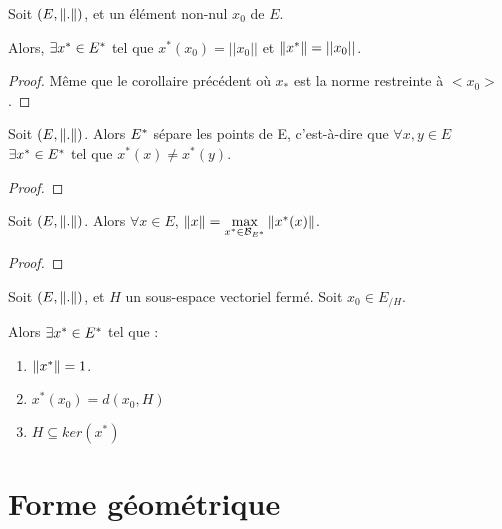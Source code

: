 \begin{corollary}
	Soit $(E, \norm{.})$, et un élément non-nul $x_{0}$ de $E$.

	Alors, $\exists x^{*} \in E^{*}$ tel que $x^{*}(x_{0}) = ||x_{0}||$ et
	$\norm{x^{*}} = ||x_{0}||$.
\end{corollary}

\ifdefined\outputproof
\begin{proof}
	Même que le corollaire précédent où $x_{*}$ est la norme restreinte à
	$<x_{0}>$.
\end{proof}
\fi

\begin{corollary}
	Soit $(E, \norm{.})$. Alors $E^{*}$ sépare les points de
	E, c'est-à-dire que $\forall x, y \in E$ $\exists x^{*} \in E^{*}$ tel
	que $x^{*}(x) \neq x^{*}(y)$.
\end{corollary}

\ifdefined\outputproof
\begin{proof}

\end{proof}
\fi

\begin{corollary}
	Soit $(E, \norm{.})$. Alors $\forall x \in E$, $\norm{x}
	= \max\limits_{x^{*} \in \mathcal{B}_{E^{*}}} \norm{x^{*}(x)}$.
\end{corollary}

\ifdefined\outputproof
\begin{proof}

\end{proof}
\fi

\begin{corollary}
	Soit $(E, \norm{.})$, et $H$ un sous-espace vectoriel fermé.
	Soit $x_{0} \in E_{/H}$.

	Alors $\exists x^{*} \in E^{*}$ tel que :

	\begin{enumerate}
		\item $\norm{x^{*}} = 1$.
		\item $x^{*}(x_{0}) = d(x_{0}, H)$
		\item $H \subseteq ker(x^{*})$
	\end{enumerate}
\end{corollary}

\section{Forme géométrique}

